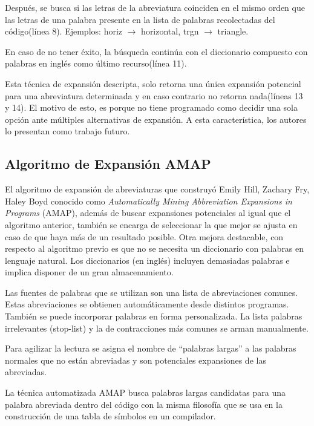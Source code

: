 \documentclass[a4paper,12pt]{report}
\begin{document}
Después, se busca si las letras de la abreviatura coinciden en el mismo orden que las letras de una palabra presente en la lista de palabras recolectadas del código(línea 8). Ejemplos: \textsf{horiz} $\rightarrow$ \textsf{horizontal}, \textsf{trgn} $\rightarrow$ \textsf{triangle}.

En caso de no tener éxito, la búsqueda continúa con el diccionario compuesto con palabras en inglés como último recurso(línea 11).


Esta técnica de expansión descripta, solo retorna una única expansión potencial para una abreviatura determinada y en caso contrario no retorna nada(líneas 13 y 14). El motivo de esto, es porque no tiene programado como decidir una sola opción ante múltiples alternativas de expansión. A esta característica, los autores lo presentan como trabajo futuro\cite{LFBEX07,EZH08}.

\subsection{Algoritmo de Expansión AMAP}

El algoritmo de expansión de abreviaturas que construyó Emily Hill, Zachary Fry, Haley Boyd\cite{EZH08} conocido como \textit{Automatically Mining Abbreviation Expansions in Programs} (AMAP), además de buscar expansiones potenciales al igual que el algoritmo anterior, también se encarga de seleccionar la que mejor se ajusta en caso de que haya más de un resultado posible. Otra mejora destacable, con respecto al algoritmo previo es que no se necesita un diccionario con palabras en lenguaje natural. Los diccionarios (en inglés) incluyen demasiadas palabras e implica disponer de un gran almacenamiento. 

Las fuentes de palabras que se utilizan son una lista de abreviaciones comunes. Estas abreviaciones se obtienen automáticamente desde distintos programas. También se puede incorporar palabras en forma personalizada. La lista palabras irrelevantes (stop-list) y la de contracciones más comunes se arman manualmente.

Para agilizar la lectura se asigna el nombre de “palabras largas” a las palabras normales que no están abreviadas y son potenciales expansiones de las abreviadas.

La técnica automatizada AMAP busca palabras largas candidatas para una palabra abreviada dentro del código con la misma filosofía que se usa en la construcción de una tabla de símbolos en un compilador.
\end{document}
